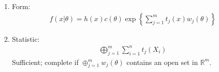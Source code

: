 \documentclass{amsart}
\begin{document}
\begin{enumerate}
  \begin{enumerate}
  \item Form:
    \begin{align*}
      f(x|\theta) = h(x) c(\theta) \exp{\left\{\sum_{j=1}^m t_j(x) w_j(\theta)\right\}}
    \end{align*}
  \item Statistic:
    \begin{align*}
      \bigoplus_{j=1}^m \sum_{i=1}^n t_j(X_i)
    \end{align*} 
    Sufficient; complete if $ \oplus_{j=1}^m w_j(\theta)$ contains an
    open set in $\mathbb{R}^m$.
  \end{enumerate}
     





\end{enumerate}
\end{document}
